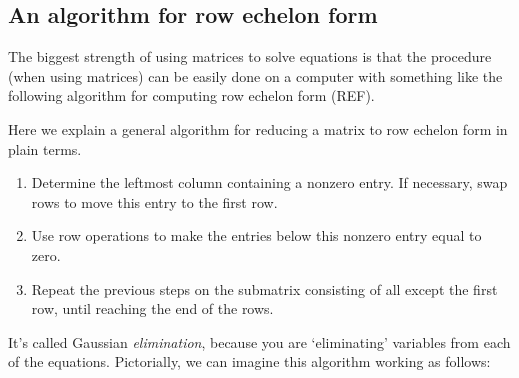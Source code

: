 \documentclass{ximera}
\begin{document}
\subsection{An algorithm for row echelon form}

The biggest strength of using matrices to solve equations is that the
procedure (when using matrices) can be easily done on a computer with
something like the following algorithm for computing row echelon form
(REF).

\begin{algorithm}
  Here we explain a general algorithm for reducing a matrix to row
  echelon form in plain terms.
  \begin{enumerate}
  \item Determine the leftmost column containing a nonzero entry. If
    necessary, swap rows to move this entry to the first row.
  \item Use row operations to make the entries below this nonzero
    entry equal to zero.
  \item Repeat the previous steps on the submatrix consisting of all
    except the first row, until reaching the end of the rows.
  \end{enumerate}
\end{algorithm}

It's called Gaussian \textit{elimination}, because you are
`eliminating' variables from each of the equations.  Pictorially, we
can imagine this algorithm working as follows:
\end{document}
